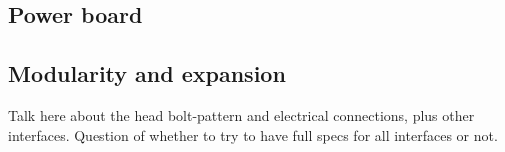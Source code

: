 \subsection{Power board}

\subsection{Modularity and expansion}
Talk here about the head bolt-pattern and electrical connections, plus other interfaces.  Question of whether 
to try to have full specs for all interfaces or not.



